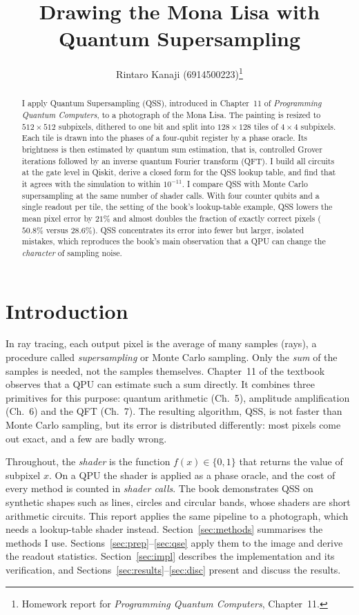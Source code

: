 \documentclass[10pt,twocolumn,a4paper]{article}
\title{Drawing the Mona Lisa with Quantum Supersampling}
\author{Rintaro Kanaji (6914500223)\thanks{Homework report for \emph{Programming Quantum
Computers}, Chapter~11.}}
\date{}
\begin{document}
\maketitle

\begin{abstract}
I apply Quantum Supersampling (QSS), introduced in Chapter~11 of
\emph{Programming Quantum Computers}, to a photograph of the Mona Lisa.
The painting is resized to $512\times512$ subpixels, dithered to one bit and
split into $128\times128$ tiles of $4\times4$ subpixels.
Each tile is drawn into the phases of a four-qubit register by a phase oracle.
Its brightness is then estimated by quantum sum estimation, that is, controlled
Grover iterations followed by an inverse quantum Fourier transform (QFT).
I build all circuits at the gate level in Qiskit, derive a closed form for the
QSS lookup table, and find that it agrees with the simulation to within
$10^{-11}$.
I compare QSS with Monte Carlo supersampling at the same number of
shader calls.
With four counter qubits and a single readout per tile, the setting of the
book's lookup-table example, QSS lowers the mean pixel error by $21\%$ and
almost doubles the fraction of exactly correct pixels ($50.8\%$ versus
$28.6\%$).
QSS concentrates its error into fewer but larger, isolated mistakes, which
reproduces the book's main observation that a QPU can change the
\emph{character} of sampling noise.
\end{abstract}

\section{Introduction}

In ray tracing, each output pixel is the average of many samples (rays), a
procedure called \emph{supersampling} or Monte Carlo sampling.
Only the \emph{sum} of the samples is needed, not the samples themselves.
Chapter~11 of the textbook~\cite{pqc} observes that a QPU can estimate such a
sum directly. It combines three primitives for this purpose: quantum
arithmetic (Ch.~5), amplitude amplification (Ch.~6) and the QFT (Ch.~7).
The resulting algorithm, QSS, is not faster than Monte Carlo sampling, but its
error is distributed differently: most pixels come out exact, and a few are
badly wrong.

Throughout, the \emph{shader} is the function $f(x)\in\{0,1\}$ that returns the
value of subpixel $x$. On a QPU the shader is applied as a phase oracle, and the
cost of every method is counted in \emph{shader calls}.
The book demonstrates QSS on synthetic shapes such as lines, circles and
circular bands, whose shaders are short arithmetic circuits.
This report applies the same pipeline to a photograph, which needs a
lookup-table shader instead.
Section~\ref{sec:methods} summarises the methods I use.
Sections~\ref{sec:prep}--\ref{sec:qse} apply them to the image and derive the
readout statistics. Section~\ref{sec:impl} describes the implementation and
its verification, and Sections~\ref{sec:results}--\ref{sec:disc} present and
discuss the results.
\end{document}
